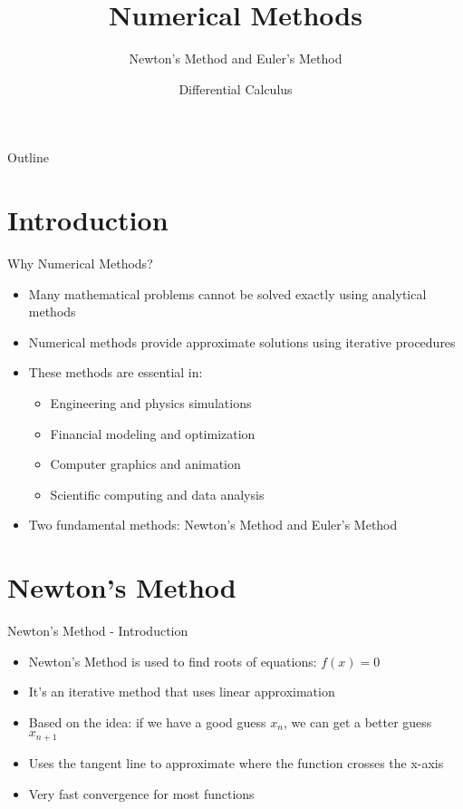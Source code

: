 \documentclass[aspectratio=169]{beamer}
\title{Numerical Methods}
\subtitle{Newton's Method and Euler's Method}
\author{Differential Calculus}
\date{}
\begin{document}
\begin{frame}
\titlepage
\end{frame}

\begin{frame}{Outline}
\tableofcontents
\end{frame}

\section{Introduction}

\begin{frame}{Why Numerical Methods?}
\begin{itemize}
    \item Many mathematical problems cannot be solved exactly using analytical methods
    \item Numerical methods provide approximate solutions using iterative procedures
    \item These methods are essential in:
    \begin{itemize}
        \item Engineering and physics simulations
        \item Financial modeling and optimization
        \item Computer graphics and animation
        \item Scientific computing and data analysis
    \end{itemize}
    \item Two fundamental methods: Newton's Method and Euler's Method
\end{itemize}
\end{frame}

\section{Newton's Method}

\begin{frame}{Newton's Method - Introduction}
\begin{itemize}
    \item Newton's Method is used to find roots of equations: $f(x) = 0$
    \item It's an iterative method that uses linear approximation
    \item Based on the idea: if we have a good guess $x_n$, we can get a better guess $x_{n+1}$
    \item Uses the tangent line to approximate where the function crosses the x-axis
    \item Very fast convergence for most functions
\end{itemize}
\end{frame}
\end{document}
